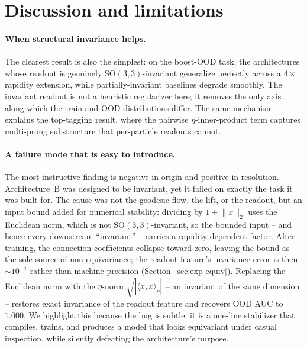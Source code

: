 \documentclass[11pt]{article}
\begin{document}
\section{Discussion and limitations}
\label{sec:discussion}
\paragraph{When structural invariance helps.}
The clearest result is also the simplest: on the boost-OOD task, the
architectures whose readout is genuinely $\mathrm{SO}(3,3)$-invariant
generalize perfectly across a $4\times$ rapidity extension, while
partially-invariant baselines degrade smoothly. The invariant readout
is not a heuristic regularizer here; it removes the only axis along
which the train and OOD distributions differ. The same mechanism
explains the top-tagging result, where the pairwise $\eta$-inner-product
term captures multi-prong substructure that per-particle readouts
cannot.

\paragraph{A failure mode that is easy to introduce.}
The most instructive finding is negative in origin and positive in
resolution. Architecture~B was designed to be invariant, yet it failed
on exactly the task it was built for. The cause was not the geodesic
flow, the lift, or the readout, but an input bound added for numerical
stability: dividing by $1 + \lVert x\rVert_2$ uses the Euclidean norm,
which is not $\mathrm{SO}(3,3)$-invariant, so the bounded input -- and
hence every downstream ``invariant'' -- carries a rapidity-dependent
factor. After training, the connection coefficients collapse toward
zero, leaving the bound as the sole source of non-equivariance; the
readout feature's invariance error is then $\sim 10^{-1}$ rather than
machine precision (Section~\ref{sec:exp-equiv}). Replacing the Euclidean
norm with the $\eta$-norm $\sqrt{|\langle x, x\rangle_\eta|}$ -- an
invariant of the same dimension -- restores exact invariance of the
readout feature and recovers OOD AUC to $1.000$. We highlight this
because the bug is subtle: it is a one-line stabilizer that compiles,
trains, and produces a model that looks equivariant under casual
inspection, while silently defeating the architecture's purpose.
\end{document}
